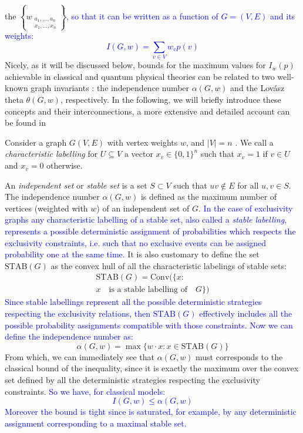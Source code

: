 \documentclass[letterpaper]{article}
\newcommand{\STAB}{\mathrm{STAB}}
\newcommand{\chull}{\mathrm{Conv}}
\begin{document}
the $\left\{w_{\substack{a_1,\ldots,a_n\\x_1,\ldots,x_n}}\right\}$,
\textcolor{blue}{so that it can be written as a function of $G = (V,
E)$ and its weights:
\begin{equation}
    I(G,w) = \sum_{v \in V}w_v p(v)
    \label{eq:linconstG}
\end{equation}
}
Nicely, as it will be discussed below, bounds for the maximum values for $I_w(p)$ achievable in classical and quantum
physical theories can be related to two well-known graph invariants \cite{cabello2014}: the
independence number $\alpha(G, w)$ and the Lovász theta $\theta(G, w)$,
respectively. In the following, we will briefly introduce these concepts and
their interconnections, a more extensive and detailed account can be found in
\cite{cabello2014,rabelo2014,acin2015}

Consider a graph $G(V, E)$ with vertex weights $w$, and $|V| = n$ .
We call a \emph{characteristic labelling} for $U \subseteq V$ a vector $x_v \in
\{0,1\}^n$ such that $x_v = 1$ if $v \in U$ and $x_v = 0$ otherwise.

An \emph{independent set} or \emph{stable set} is a set
$S \subset V$ such that $uv \notin E$ for all $u,v \in S$.
The independence number $\alpha(G, w)$ is defined as the maximum number of
vertices (weighted with $w$) of an independent set of $G$. 
\textcolor{blue}{
 In the case of exclusivity graphs any characteristic labelling of
 a stable set, also called a \emph{stable labelling}, represents a
 possible deterministic assignment of probabilities which respects the
 exclusivity constraints, i.e. such that no exclusive events can be
 assigned probability one at the same time.
}
It is also customary to define the set $\STAB(G)$ as the convex hull of
all the characteristic labelings of stable sets:
\begin{multline} 
    \STAB(G) = \chull (\{x : \\ x \quad \text{is a stable labelling of}\quad G \})
    \label{eq:stab}
\end{multline}
\textcolor{blue}{
Since stable labellings represent all the possible deterministic strategies respecting the 
exclusivity relations, then $\STAB(G)$ effectively includes  all the possible 
probability assignments compatible with those constraints.
Now we can define the independence number as:
}
\begin{equation}
    \alpha(G,w) = \max\{w\cdot x: x \in \STAB(G)\}
    \label{eq:alphastab}
\end{equation}
From which, we can immediately see that $\alpha(G,w)$ must corresponds to the
classical bound of the inequality, since it is exactly the maximum over
the convex set defined by all the deterministic strategies respecting
the exclusivity constraints.
\textcolor{blue}{So we have, for classical models:
\begin{equation}
    I(G,w) \le \alpha(G,w)
    \label{eq:linconstG_alphabound}
\end{equation}
Moreover the bound is tight since is saturated, for example, by
any deterministic assignment corresponding to a maximal stable set.}
\end{document}
